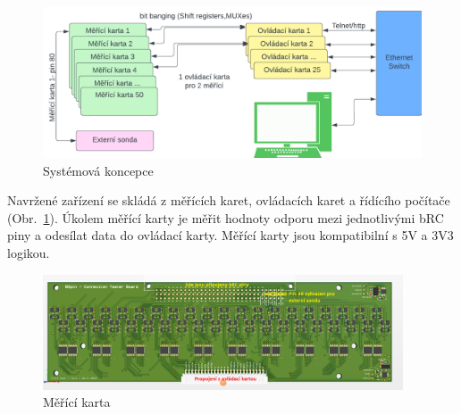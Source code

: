     \begin{figure}[ht!]
        \centering
        \includegraphics[width = 1\textwidth]{obrazky/telnet_http_pc.png}
        \caption{Systémová koncepce}
        \label{fig:Systémová koncepce}
    \end{figure}\par
    \clearpage
    Navržené zařízení se skládá z měřících karet,
    ovládacích karet a řídícího počítače \mbox{(Obr. \ref{fig:Systémová koncepce})}.
    Úkolem měřící karty je měřit hodnoty odporu mezi jednotlivými bRC piny
    a odesílat data do ovládací karty. Měřící karty jsou kompatibilní s 5V a 3V3 logikou.
    \begin{figure}[ht!] 
        \centering
        \includegraphics[width = 0.95\textwidth]{obrazky/karta_3D_NP.png}
        \caption{Měřící karta}
        \label{fig:Měřící karta}
    \end{figure}

